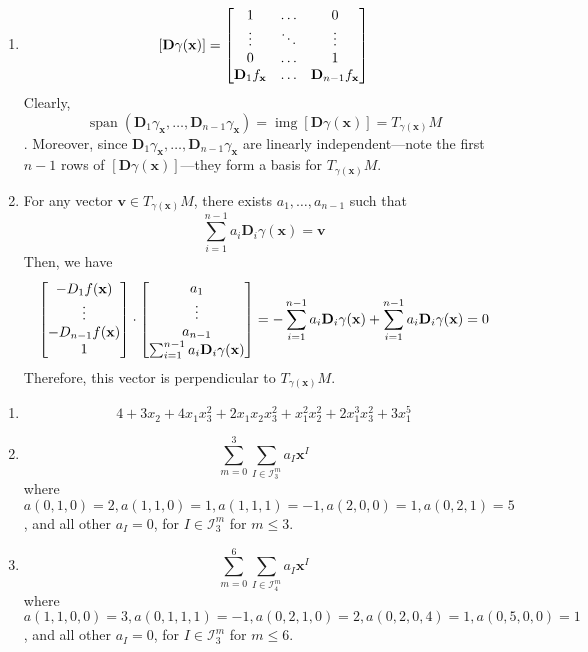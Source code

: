 \documentclass{homework}
\begin{document}
\begin{problem}{4}
\begin{enumerate}
\item
$$[\mathbf{D}\gamma(\mathbf{x})] = \begin{bmatrix}
1      & \hdots & 0      \\
\vdots & \ddots & \vdots \\
0      & \hdots & 1      \\
\mathbf{D}_1f_\mathbf{x} & \hdots & \mathbf{D}_{n-1}f_\mathbf{x}\\
\end{bmatrix}$$
Clearly,
$$\operatorname{span}(\mathbf{D}_1\gamma_{\mathbf{x}}, \dots,
\mathbf{D}_{n-1}\gamma_{\mathbf{x}}) = \operatorname{img}
[\mathbf{D}\gamma(\mathbf{x})] = T_{\gamma(\mathbf{x})}M$$
. Moreover, since
$\mathbf{D}_1\gamma_{\mathbf{x}}, \dots, \mathbf{D}_{n-1}\gamma_{\mathbf{x}}$
are linearly independent---note the first $n-1$ rows of 
$[\mathbf{D}\gamma(\mathbf{x})]$---they form a basis for 
$T_{\gamma(\mathbf{x})}M$. \QED

\item
For any vector $\mathbf{v} \in T_{\gamma(\mathbf{x})}M$, there exists $a_1,
\dots, a_{n-1}$ such that
$$\sum_{i=1}^{n-1}a_i\mathbf{D}_i\gamma(\mathbf{x}) = \mathbf{v}$$
Then, we have
$$\begin{bmatrix}
-D_1f(\mathbf{x})\\
\vdots\\
-D_{n-1}f(\mathbf{x})\\
1\end{bmatrix} \cdot \begin{bmatrix}
a_1\\
\vdots\\
a_{n-1}\\
\sum_{i=1}^{n-1}a_i\mathbf{D}_i\gamma(\mathbf{x})
\end{bmatrix} = -\sum_{i=1}^{n-1}a_i\mathbf{D}_i\gamma(\mathbf{x})
  +  \sum_{i=1}^{n-1}a_i\mathbf{D}_i\gamma(\mathbf{x})
  = 0$$
Therefore, this vector is perpendicular to $T_{\gamma(\mathbf{x})}M$. \QED

\end{enumerate}
\end{problem}

\begin{problem}{5}
\begin{enumerate}
\item
$$4+3x_2+4x_1x_3^2+2x_1x_2x_3^2+x_1^2x_2^2+2x_1^3x_3^2+3x_1^5$$

\item
$$\sum^3_{m=0}\sum_{I \in \mathcal{I}^m_3} a_I\mathbf{x}^I$$
where $a(0,1,0)=2,a(1,1,0)=1,a(1,1,1)=-1,a(2,0,0)=1,a(0,2,1)=5$, and all other
$a_I = 0$, for $I \in \mathcal{I}^m_3$ for $m \leq 3$.

\item
$$\sum^6_{m=0}\sum_{I \in \mathcal{I}^m_4} a_I\mathbf{x}^I$$
where $a(1,1,0,0)=3,a(0,1,1,1)=-1,a(0,2,1,0)=2,a(0,2,0,4)=1,a(0,5,0,0)=1$, and 
all other $a_I = 0$, for $I \in \mathcal{I}^m_3$ for $m \leq 6$.
\end{enumerate}
\end{problem}
\end{document}
